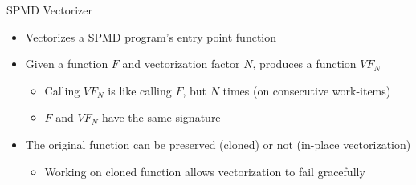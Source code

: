 \begin{frame}{SPMD Vectorizer}

\begin{minipage}[t]{0.45\linewidth}

\begin{itemize}
    \item Vectorizes a SPMD program's entry point function
    \item Given a function $F$ and vectorization factor $N$, produces a function $VF_N$
    \begin{itemize}
        \item Calling $VF_N$ is like calling $F$, but $N$ times (on consecutive work-items)
        \item $F$ and $VF_N$ have the same signature
    \end{itemize}
    
    \item The original function can be preserved (cloned) or not (in-place vectorization)
    \begin{itemize}
        \item Working on cloned function allows vectorization to fail gracefully
    \end{itemize}
    
\end{itemize}

\end{minipage}
\hspace{1em}
\begin{minipage}[t]{0.48\linewidth}

\vspace{0.1ex}

\end{minipage}

\end{frame}

